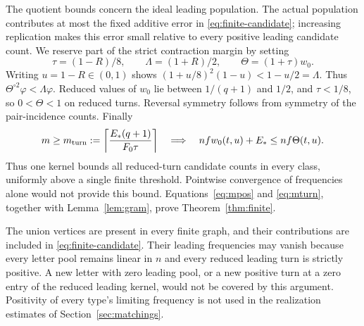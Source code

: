 The quotient bounds concern the ideal leading population. The actual population contributes at most the fixed additive error in \eqref{eq:finite-candidate}; increasing replication makes this error small relative to every positive leading candidate count. We reserve part of the strict contraction margin by setting
\begin{equation}\label{eq:inflation}
 \tau=(1-R)/8,\qquad \Lambda=(1+R)/2,\qquad \Theta=(1+\tau)w_0.
\end{equation}
Writing $u=1-R\in(0,1)$ shows
$(1+u/8)^2(1-u)<1-u/2=\Lambda$.
Thus $\Theta^{\circ2}\varphi<\Lambda\varphi$. Reduced values of $w_0$ lie between $1/(q+1)$ and $1/2$, and $\tau<1/8$, so $0<\Theta<1$ on reduced turns. Reversal symmetry follows from symmetry of the pair-incidence counts. Finally
\begin{equation}\label{eq:mturn}
 m\ge m_{\rm turn}:=\left\lceil \frac{E_*(q+1)}{F_0\tau}\right\rceil
 \quad\Longrightarrow\quad
 nfw_0(t,u)+E_*\le nf\Theta(t,u).
\end{equation}
Thus one kernel bounds all reduced-turn candidate counts in every class, uniformly above a single finite threshold. Pointwise convergence of frequencies alone would not provide this bound. Equations~\eqref{eq:mpos} and \eqref{eq:mturn}, together with Lemma~\ref{lem:gram}, prove Theorem~\ref{thm:finite}.

\begin{remark}\label{rem:rare}
The union vertices are present in every finite graph, and their contributions are included in \eqref{eq:finite-candidate}. Their leading frequencies may vanish because every letter pool remains linear in $n$ and every reduced leading turn is strictly positive. A new letter with zero leading pool, or a new positive turn at a zero entry of the reduced leading kernel, would not be covered by this argument. Positivity of every type's limiting frequency is not used in the realization estimates of Section~\ref{sec:matchings}.
\end{remark}
